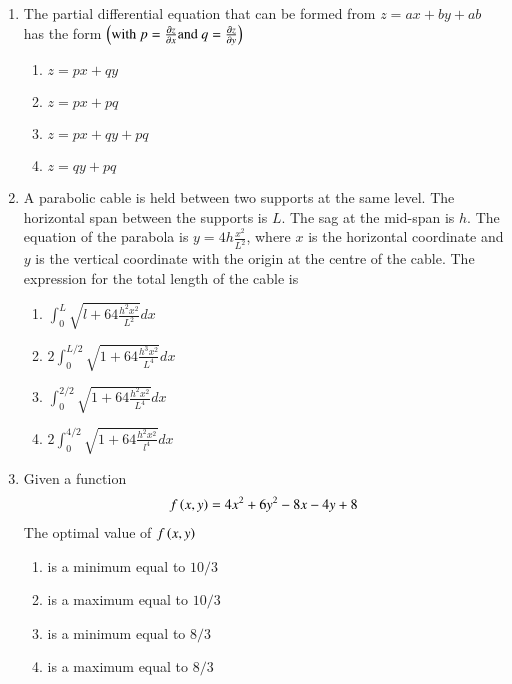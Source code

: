 \documentclass[journal]{IEEEtran}
\begin{document}
\begin{enumerate}
\begin{enumerate}
	       \end{enumerate}	
       \item The partial differential equation that can be formed from $z=a x+b y+a b$ has the form $\left(\text{with } p=\frac{\partial z}{\partial x} \text{and } q=\frac{\partial z}{\partial y}\right)$
		\begin{enumerate}
			\item $z=p x+q y$
			\item $z=p x+p q$
			\item $z=p x+q y+p q$
			\item $z=q y+p q$
		\end{enumerate}
	\item  A parabolic cable is held between two supports at the same level. The horizontal span between the supports is $L$. The sag at the mid-span is $h$. The equation of the parabola is $y=4 h \frac{x^{2}}{L^{2}}$, where $x$ is the horizontal coordinate and $y$ is the vertical coordinate with the origin at the centre of the cable. The expression for the total length of the cable is
		\begin{enumerate}
			\item $\int_{0}^{L} \sqrt{l+64 \frac{h^{2} x^{2}}{L^{2}}} d x$
			\item $2 \int_{0}^{L / 2} \sqrt{1+64 \frac{h^{3} x^{2}}{L^{4}}} d x$
			\item $\int_{0}^{2 / 2} \sqrt{1+64 \frac{h^{2} x^{2}}{L^{4}}} d x$
	        \item $2 \int_{0}^{4 / 2} \sqrt{1+64 \frac{h^{2} x^{2}}{l^{4}}} d x$
        	\end{enumerate}
	\item Given a function 
          \begin{align*}
           f\left(x, y\right)=4 x^{2}+6 y^{2}-8 x-4 y+8
           \end{align*}
           The optimal value of $f\left(x, y\right)$
		\begin{enumerate}
		       \item is a minimum equal to $10 / 3$
		       \item is a maximum equal to $10 / 3$
		       \item is a minimum equal to $8 / 3$
		       \item is a maximum equal to $8 / 3$
        	\end{enumerate}	

\end{enumerate}
\end{document}
